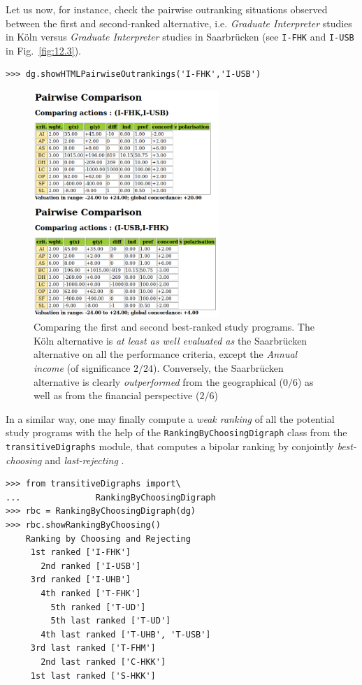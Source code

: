 Let us now, for instance, check the pairwise outranking situations observed between the first and second-ranked alternative, i.e. \emph{Graduate Interpreter} studies in Köln versus \emph{Graduate Interpreter} studies in Saarbrücken (see \texttt{I-FHK} and \texttt{I-USB} in Fig.~\vref{fig:12.3}).
\begin{lstlisting}
>>> dg.showHTMLPairwiseOutrankings('I-FHK','I-USB')
\end{lstlisting}
\begin{figure}[ht]
\sidecaption[t]
\includegraphics[width=7cm]{Figures/12-6-pairwiseComparison.png}
\caption[Comparing the first and second best-ranked study programs]{Comparing the first and second best-ranked study programs. The Köln alternative is \emph{at least as well evaluated as} the Saarbrücken alternative on all the performance criteria, except the \emph{Annual income} (of significance $2/24$). Conversely, the Saarbrücken alternative is clearly \emph{outperformed} from the geographical ($0/6$) as well as from the financial perspective ($2/6$)}
\label{fig:12.6}       %
\end{figure}

In a similar way, one may finally compute a \emph{weak ranking} of all the potential study programs with the help of the \texttt{RankingByChoosingDigraph} class from the \texttt{transitiveDigraphs} module, that computes a bipolar ranking by conjointly \emph{best-choosing} and \emph{last-rejecting} \citep{BIS-1999}.
\begin{lstlisting}[caption={Weakly ranking by bipolar best-choosing and last-rejecting},label=list:12.6]
>>> from transitiveDigraphs import\
...               RankingByChoosingDigraph
>>> rbc = RankingByChoosingDigraph(dg)
>>> rbc.showRankingByChoosing()
    Ranking by Choosing and Rejecting
     1st ranked ['I-FHK'] 
       2nd ranked ['I-USB']
	 3rd ranked ['I-UHB']
	   4th ranked ['T-FHK']
	     5th ranked ['T-UD']
	     5th last ranked ['T-UD']
	   4th last ranked ['T-UHB', 'T-USB']
	 3rd last ranked ['T-FHM']
       2nd last ranked ['C-HKK']
     1st last ranked ['S-HKK']
\end{lstlisting}

